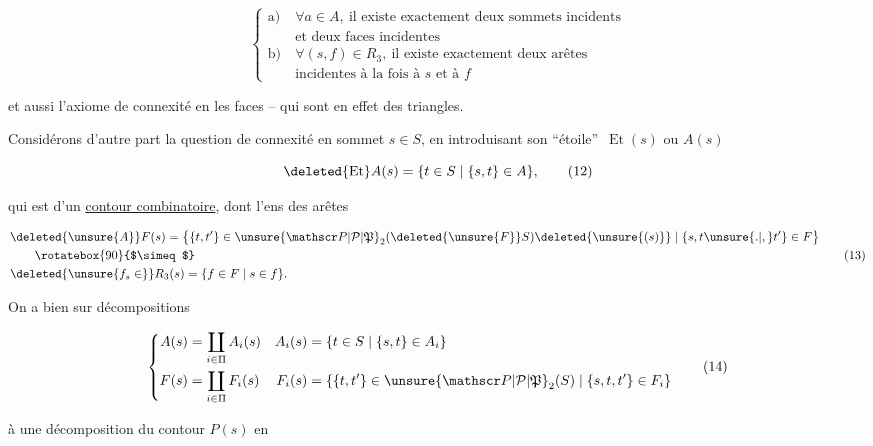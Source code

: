 \[
\left\{\begin{aligned}
 \text{a)}\ &\forall a\in A,\ \text{il existe exactement deux sommets incidents}\\
 &\text{et deux faces incidentes}\\
 \text{b)}\ &\forall(s,f)\in R_3,\ \text{il existe exactement deux arêtes}\\
 &\text{incidentes à la fois à }s\text{ et à }f
\end{aligned}\right.\tag*{(11)}
\]

et aussi l'axiome de connexité en les faces -- qui sont en effet des triangles.

Considérons d'autre part la question de connexité en  sommet $s\in S$, en introduisant son ``étoile''\ $\operatorname{Et}(s)$ ou $A(s)$

\[
\deleted{\operatorname{Et}}A(s)=\{t\in S\mid\{s,t\}\in A\},\tag*{(12)}
\]

qui est  d'un  \uline{contour combinatoire}, dont l'ens des arêtes 


\[
\begin{aligned}
 &\deleted{\unsure{A}} F(s)=\bigl\{\{t,t'\}\in\unsure{\mathscr P|\mathcal P|\mathfrak P}_2(\deleted{\unsure{F}}S)\deleted{\unsure{(s)}}\mid\{s,t\unsure{.|,}t'\}\in F\bigr\}\\
 &\qquad\rotatebox{90}{$\simeq$}\\
 &\deleted{\unsure{f_s\in}}R_3(s)=\{f\in F\mid s\in f\}.
\end{aligned}\tag*{(13)}
\]

On a bien sur  décompositions

\[
\left\{\begin{aligned}
 A(s)&=\coprod_{i\in\Pi}A_i(s)& A_i(s)&=\{t\in S\mid\{s,t\}\in A_i\}\\
 F(s)&=\coprod_{i\in\Pi}F_i(s)& F_i(s)&=\{\{t,t'\}\in\unsure{\mathscr P|\mathcal P|\mathfrak P}_2(S)\mid\{s,t,t'\}\in F_i\}
\end{aligned}\right.\tag*{(14)}
\]

  à une décomposition du contour $P(s)$ en

